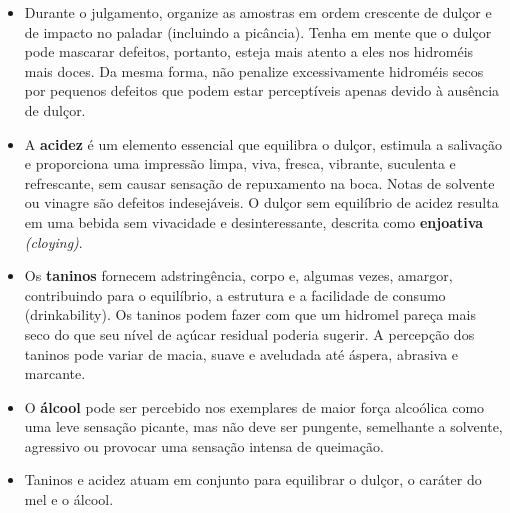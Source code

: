 \begin{itemize}
\begin{itemize}

\item \textbf{Seco (Dry)}: FG 0,990 - 1,010. Sem percepção de dulçor, mas não precisa apresentar uma sensação extremamente seca.
\item \textbf{Médio/Semi-seco (Semi-sweet)}: FG 1,010 - 1,025. A percepção é adocicada mas ainda equilibrada e refrescante. Também denominado meio-seco ou demi-sec.
\item \textbf{Doce/Suave (Sweet)}: FG 1,025 - 1,050. Varia de claramente doce até níveis semelhantes aos de vinhos de sobremesa. Não deve ser como xarope, enjoativo ou apresentar sabor de mel não fermentado. Alguns estilos regionais e hidroméis de sobremesa podem ultrapassar esse nível.

\end{itemize}

\item Durante o julgamento, organize as amostras em ordem crescente de dulçor e de impacto no paladar (incluindo a picância). Tenha em mente que o dulçor pode mascarar defeitos, portanto, esteja mais atento a eles nos hidroméis mais doces. Da mesma forma, não penalize excessivamente hidroméis secos por pequenos defeitos que podem estar perceptíveis apenas devido à ausência de dulçor.
\item A \textbf{acidez} é um elemento essencial que equilibra o dulçor, estimula a salivação e proporciona uma impressão limpa, viva, fresca, vibrante, suculenta e refrescante, sem causar sensação de repuxamento na boca. Notas de solvente ou vinagre são defeitos indesejáveis. O dulçor sem equilíbrio de acidez resulta em uma bebida sem vivacidade e desinteressante, descrita como \textbf{enjoativa} \textit{(cloying)}.
\item Os \textbf{taninos} fornecem adstringência, corpo e, algumas vezes, amargor, contribuindo para o equilíbrio, a estrutura e a facilidade de consumo (drinkability). Os taninos podem fazer com que um hidromel pareça mais seco do que seu nível de açúcar residual poderia sugerir. A percepção dos taninos pode variar de macia, suave e aveludada até áspera, abrasiva e marcante.
\item O \textbf{álcool} pode ser percebido nos exemplares de maior força alcoólica como uma leve sensação picante, mas não deve ser pungente, semelhante a solvente, agressivo ou provocar uma sensação intensa de queimação.
\item Taninos e acidez atuam em conjunto para equilibrar o dulçor, o caráter do mel e o álcool.

\end{itemize}